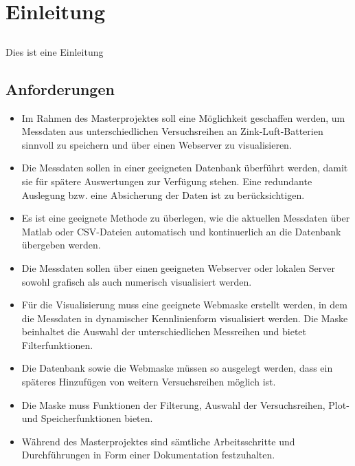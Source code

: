 \chapter{Einleitung}\label{ch:einleitung}

\section{}

Dies ist eine Einleitung

\section{Anforderungen}

\begin{itemize}

\item Im Rahmen des Masterprojektes soll eine Möglichkeit geschaffen werden, um Messdaten aus unterschiedlichen Versuchsreihen an Zink-Luft-Batterien sinnvoll zu speichern und über einen Webserver zu visualisieren.
\item Die Messdaten sollen in einer geeigneten Datenbank überführt werden, damit sie für spätere Auswertungen zur Verfügung stehen. Eine redundante Auslegung bzw. eine Absicherung der Daten ist zu berücksichtigen.
\item Es ist eine geeignete Methode zu überlegen, wie die aktuellen Messdaten über Matlab oder CSV-Dateien automatisch und kontinuerlich an die Datenbank übergeben werden.
\item Die Messdaten sollen über einen geeigneten Webserver oder lokalen Server sowohl grafisch als auch numerisch visualisiert werden.
\item Für die Visualisierung muss eine geeignete Webmaske erstellt werden, in dem die Messdaten in dynamischer Kennlinienform visualisiert werden. Die Maske beinhaltet die Auswahl der unterschiedlichen Messreihen und bietet Filterfunktionen.
\item Die Datenbank sowie die Webmaske müssen so ausgelegt werden, dass ein späteres Hinzufügen von weitern Versuchsreihen möglich ist.
\item  Die Maske muss Funktionen der Filterung, Auswahl der Versuchsreihen, Plot- und Speicherfunktionen bieten.
\item Während des Masterprojektes sind sämtliche Arbeitsschritte und Durchführungen in Form einer Dokumentation festzuhalten.

\end{itemize}
